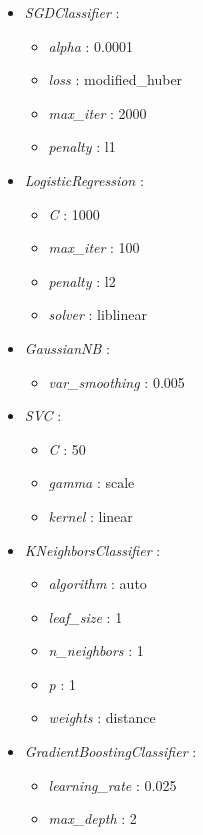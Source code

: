 \documentclass{article}
\begin{document}
\begin{footnotesize}
\begin{multicols}{2}
\begin{itemize}
    \item \textit{SGDClassifier} :
    \begin{itemize}
        \item \textit{alpha} : 0.0001
        \item \textit{loss} : modified\_huber
        \item \textit{max\_iter} : 2000
        \item \textit{penalty} : l1
    \end{itemize}
    \item \textit{LogisticRegression} :
    \begin{itemize}
        \item \textit{C} : 1000
        \item \textit{max\_iter} : 100
        \item \textit{penalty} : l2
        \item \textit{solver} : liblinear
    \end{itemize}
    \item \textit{GaussianNB} :
    \begin{itemize}
        \item \textit{var\_smoothing} : 0.005
    \end{itemize}
    \item \textit{SVC} :
    \begin{itemize}
        \item \textit{C} : 50
        \item \textit{gamma} : scale
        \item \textit{kernel} : linear
    \end{itemize}
    \item \textit{KNeighborsClassifier} :
    \begin{itemize}
        \item \textit{algorithm} : auto
        \item \textit{leaf\_size} : 1
        \item \textit{n\_neighbors} : 1
        \item \textit{p} : 1
        \item \textit{weights} : distance
    \end{itemize}
    \item \textit{GradientBoostingClassifier} :
    \begin{itemize}
        \item \textit{learning\_rate} : 0.025
        \item \textit{max\_depth} : 2

\end{itemize}
\end{itemize}
\end{multicols}
\end{footnotesize}
\end{document}
